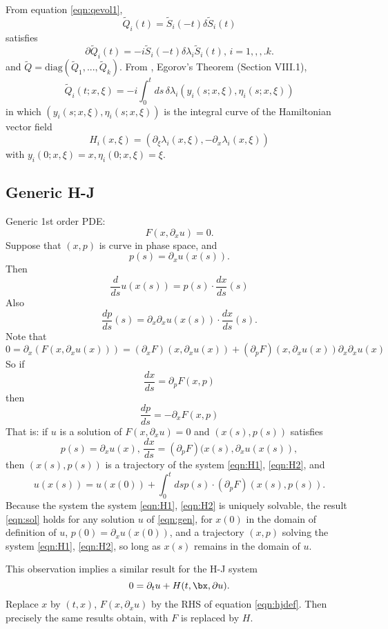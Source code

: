 From equation \ref{eqn:qevol1},
\[
  \tilde{Q}_i(t) = \tilde{S}_i(-t)\delta \tilde{S}_i(t)
\]
satisfies
\[
  \partial \tilde{Q}_i(t) = -i\tilde{S}_i(-t)\delta \lambda_i \tilde{S}_i(t), \, i=1,,,.k.
\]
and $\tilde{Q} = \mbox{diag}(\tilde{Q}_1,...,\tilde{Q}_k)$.
From \cite{Tay:81}, Egorov's Theorem (Section VIII.1),
\[
  \tilde{Q}_i(t; x,\xi) = -i \int_0^t ds \,\delta \lambda_i(y_i(s;x,\xi),\eta_i(s;x,\xi))
\]
in which $(y_i(s;x,\xi),\eta_i(s;x,\xi))$ is the integral curve of the Hamiltonian vector field
\[
  H_i(x,\xi) = (\partial_{\xi}\lambda_i(x,\xi), - \partial_x\lambda_i(x,\xi))
\]
with $y_i(0;x,\xi)=x, \eta_i(0;x,\xi)=\xi$.

\subsection{Generic H-J}
Generic 1st order PDE:
\begin{equation}
  \label{eqn:gen}
  F(x, \partial_x u) = 0.
\end{equation}
Suppose that $(x,p)$
is curve in phase space, and
\begin{equation}
  \label{eqn:defp}
  p(s) = \partial_x u(x(s)).
\end{equation}
Then
\[
  \frac{d}{ds}u(x(s))=p(s) \cdot \frac{dx}{ds}(s)
\]
Also
\[
  \frac{dp}{ds}(s) = \partial_x \partial_x u(x(s))\cdot
  \frac{dx}{ds}(s).
\]
Note that
\[
  0 = \partial_x( F(x, \partial_x u(x))) = (\partial_x F)(x,
  \partial_x u(x)) + 
  (\partial_p F)(x, \partial_x u(x)) \partial_x \partial_x u(x)
\]
So if
\begin{equation}
  \label{eqn:H1}
  \frac{dx}{ds} = \partial_p F(x,p)
\end{equation}
then
\begin{equation}
  \label{eqn:H2}
  \frac{dp}{ds} = -\partial_x F(x,p)
\end{equation}
That is: if $u$ is a solution of $F(x,\partial_x u)=0$ and
$(x(s),p(s))$ satisfies
\[
  p(s)=\partial_x u(x),\, \frac{dx}{ds} = (\partial_p
  F)(x(s),\partial_x u(x(s)),
\]
then $(x(s),p(s))$ is a trajectory of the system \ref{eqn:H1},
\ref{eqn:H2}, and
\begin{equation}
  \label{eqn:sol}
  u(x(s))=u(x(0)) + \int_0^t ds p(s)\cdot (\partial_p F)(x(s),p(s)).
\end{equation}
Because the system the system \ref{eqn:H1},
\ref{eqn:H2} is uniquely solvable, the result \ref{eqn:sol} holds for
any solution $u$ of \ref{eqn:gen}, for $x(0)$ in the domain of
definition of $u$, $p(0)=\partial_xu(x(0))$, and a trajectory $(x,p)$
solving the system \ref{eqn:H1}, \ref{eqn:H2}, so long as $x(s)$
remains in the domain of $u$.

This observation implies a similar result for the H-J system
\begin{equation}
  \label{eqn:hjdef}
  0 = \partial_t u + H(t,\bx,\partial u).
\end{equation}
Replace $x$ by $(t,x)$, $F(x,\partial_x u)$ by the RHS of equation
\ref{eqn:hjdef}.  Then precisely the same results obtain, with $F$ is
replaced by $H$.



